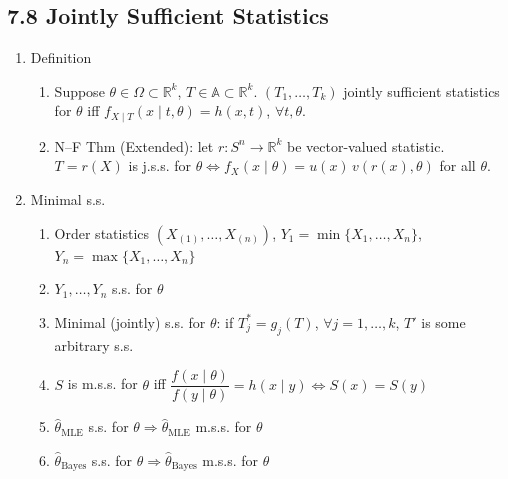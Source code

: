 \documentclass[11pt]{article}
\begin{document}
\subsection*{7.8 Jointly Sufficient Statistics}
\begin{enumerate}[label=\Roman*.]
  \item Definition
  \begin{enumerate}[label=\Alph*.]
    \item Suppose $\theta\in\Omega\subset\mathbb{R}^{k}$, $T\in\mathbb{A}\subset\mathbb{R}^{k}$. $(T_{1},\dots,T_{k})$ jointly sufficient statistics for $\theta$ iff $f_{X\mid T}(x\mid t,\theta)=h(x,t)$, $\forall t,\theta$.
    \item N--F Thm (Extended): let $r:S^{n}\to\mathbb{R}^{k}$ be vector-valued statistic. $T=r(X)$ is j.s.s. for $\theta \iff f_{X}(x\mid\theta)=u(x)\,v(r(x),\theta)$ for all $\theta$.
  \end{enumerate}
  \item Minimal s.s.
  \begin{enumerate}[label=\Alph*.]
    \item Order statistics $(X_{(1)},\dots,X_{(n)})$, $Y_{1}=\min\{X_{1},\dots,X_{n}\}$, $Y_{n}=\max\{X_{1},\dots,X_{n}\}$
    \item $Y_{1},\dots,Y_{n}$ s.s. for $\theta$
    \item Minimal (jointly) s.s. for $\theta$: if $T_{j}^{*}=g_{j}(T)$, $\forall j=1,\dots,k$, $T'$ is some arbitrary s.s.
    \item $S$ is m.s.s. for $\theta$ iff $\dfrac{f(x\mid\theta)}{f(y\mid\theta)}=h(x\mid y)\iff S(x)=S(y)$
    \item $\hat\theta_{\text{MLE}}$ s.s. for $\theta \Rightarrow \hat\theta_{\text{MLE}}$ m.s.s. for $\theta$
    \item $\hat\theta_{\text{Bayes}}$ s.s. for $\theta \Rightarrow \hat\theta_{\text{Bayes}}$ m.s.s. for $\theta$
  \end{enumerate}
\end{enumerate}
\end{document}
